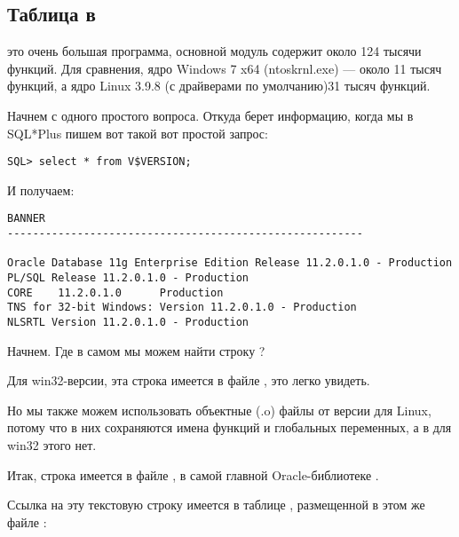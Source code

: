 \subsection{Таблица  в \oracle}

\myindex{\oracle}
 это очень большая программа, основной модуль  содержит около 124 тысячи функций. Для сравнения, ядро Windows 7 x64 (ntoskrnl.exe) --- около 11 тысяч функций, а ядро Linux 3.9.8 (с драйверами по умолчанию)\EMDASH{}31 тысяч функций.

Начнем с одного простого вопроса. Откуда \oracle берет информацию, когда мы в SQL*Plus пишем вот такой вот простой запрос:

\begin{lstlisting}
SQL> select * from V$VERSION;
\end{lstlisting}

И получаем:

\begin{lstlisting}
BANNER
--------------------------------------------------------

Oracle Database 11g Enterprise Edition Release 11.2.0.1.0 - Production
PL/SQL Release 11.2.0.1.0 - Production
CORE    11.2.0.1.0      Production
TNS for 32-bit Windows: Version 11.2.0.1.0 - Production
NLSRTL Version 11.2.0.1.0 - Production
\end{lstlisting}

Начнем. Где в самом \oracle мы можем найти строку ?

Для win32-версии, эта строка имеется в файле , это легко увидеть.

Но мы также можем использовать объектные (.o) файлы от версии \oracle для Linux, потому что в них сохраняются имена функций и глобальных переменных, а в  для win32 этого нет.

Итак, строка  имеется в файле , в самой главной Oracle-библиотеке .

Ссылка на эту текстовую строку имеется в таблице , размещенной в этом же файле :


